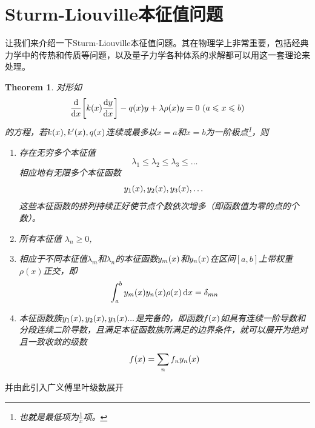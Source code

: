 \documentclass[12pt,a4paper,openany,twoside]{book}
\newtheorem{theorem}{Theorem}[section]
\numberwithin{equation}{section}
\begin{document}
      \section{Sturm-Liouville本征值问题}
        \label{sturm_Liouville_eigenvalue_problem}
        让我们来介绍一下Sturm-Liouville本征值问题。其在物理学上非常重要，包括经典力学中的传热和传质等问题，以及量子力学各种体系的求解都可以用这一套理论来处理。
        \begin{theorem}
          对形如
          \begin{equation}
            \dv{x}\qty[k\qty(x)\dv{y}{x}]-q\qty(x)y+\lambda\rho\qty(x)y=0\ (a\leqslant x\leqslant b)
          \end{equation}
          的方程，若$k\qty(x),k'\qty(x),q\qty(x)$连续或最多以$x=a$和$x=b$为一阶极点\footnote{也就是最低项为$\frac{1}{x}$项。}，则
          \begin{enumerate}
            \item 存在无穷多个本征值
              \begin{equation*}
                \lambda_1\leqslant\lambda_2\leqslant\lambda_3\leqslant\dots
              \end{equation*} 
              相应地有无限多个本征函数
              \begin{equation*}
                y_1\qty(x),y_2\qty(x),y_3\qty(x),\dots
              \end{equation*}
              这些本征函数的排列持续正好使节点个数依次增多（即函数值为零的点的个数）。
            \item 所有本征值 $\lambda_n\geqslant 0$,
            \item 相应于不同本征值$\lambda_m$和$\lambda_n$的本征函数$y_m\qty(x)$和$y_n\qty(x)$在区间$[a,b]$上带权重$\rho(x)$正交，即
              \begin{equation}
                \int^b_a{y_m\qty(x)y_n\qty(x)\rho\qty(x)\dd{x}}=\delta_{mn} 
              \end{equation}
            \item 本征函数族$y_1\qty(x),y_2\qty(x),y_3\qty(x)...$是完备的，即函数$f\qty(x)$如具有连续一阶导数和分段连续二阶导数，且满足本征函数族所满足的边界条件，就可以展开为绝对且一致收敛的级数
              \begin{equation*}
                f\qty(x)=\sum_n{f_n y_n\qty(x)}
              \end{equation*}
          \end{enumerate}
        \end{theorem}
        并由此引入广义傅里叶级数展开
\end{document}
